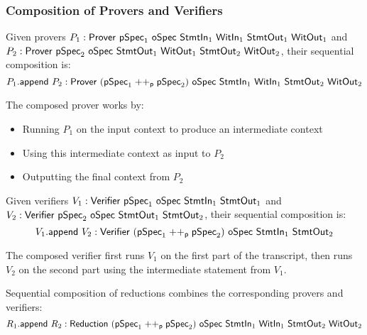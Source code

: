 \subsubsection{Composition of Provers and Verifiers}

\begin{definition}
    \label{def:prover_append}
    Given provers $P_1 : \Prover\ \pSpec_1\ \oSpec\ \StmtIn_1\ \WitIn_1\ \StmtOut_1\ \WitOut_1$ and $P_2 : \Prover\ \pSpec_2\ \oSpec\ \StmtOut_1\ \WitOut_1\ \StmtOut_2\ \WitOut_2$, their sequential composition is:
    \[ P_1.\append\ P_2 : \Prover\ (\pSpec_1 \mathrel{++_\mathsf{p}} \pSpec_2)\ \oSpec\ \StmtIn_1\ \WitIn_1\ \StmtOut_2\ \WitOut_2 \]

    The composed prover works by:
    \begin{itemize}
        \item Running $P_1$ on the input context to produce an intermediate context
        \item Using this intermediate context as input to $P_2$
        \item Outputting the final context from $P_2$
    \end{itemize}
\end{definition}

\begin{definition}
    \label{def:verifier_append}
    Given verifiers $V_1 : \Verifier\ \pSpec_1\ \oSpec\ \StmtIn_1\ \StmtOut_1$ and $V_2 : \mathsf{Verifier}\ \mathsf{pSpec}_2\ \mathsf{oSpec}\ \mathsf{StmtOut}_1\ \mathsf{StmtOut}_2$, their sequential composition is:
    \[ V_1.\append\ V_2 : \Verifier\ (\pSpec_1 \mathrel{++_\mathsf{p}} \pSpec_2)\ \oSpec\ \StmtIn_1\ \StmtOut_2 \]

    The composed verifier first runs $V_1$ on the first part of the transcript, then runs $V_2$ on the second part using the intermediate statement from $V_1$.
\end{definition}

\begin{definition}
    \label{def:reduction_append}
    Sequential composition of reductions combines the corresponding provers and verifiers:
    \[ R_1.\append\ R_2 : \Reduction\ (\pSpec_1 \mathrel{++_\mathsf{p}} \pSpec_2)\ \oSpec\ \StmtIn_1\ \WitIn_1\ \StmtOut_2\ \WitOut_2 \]
\end{definition}

